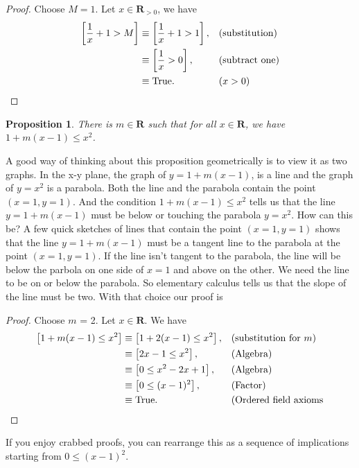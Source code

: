 \documentclass[12pt,fleqn,answers]{article}
\newcommand{\reals}{\mathbf{R}}
\newcommand{\true}{\mathrm{True}}
\newenvironment{myproof}
  {\begin{shaded}\begin{proof}}
  {\end{proof}\end{shaded}}
\newtheorem{prop}{Proposition}
\begin{document}
    \begin{myproof} Choose $M=1$. Let $x  \in \reals_{>0}$, we have
    \begin{align*}
      \left [ \frac{1}{x} + 1 > M \right] &\equiv    \left [ \frac{1}{x} + 1 > 1 \right], &&(\text{substitution}) \\
                                                               &\equiv    \left [ \frac{1}{x}  > 0 \right], &&(\text{subtract one}) \\
                                                               &\equiv \true.    &&  (x > 0) \qedhere
  \end{align*} 
    
    
    \end{myproof}



        \begin{prop}
      There is $m \in \reals$ such that for all $x \in \reals$, we 
     have $1 + m(x-1) \leq x^2$. 
     \end{prop}
     
      A good way of thinking about this proposition geometrically is to view it as two graphs. In the x-y plane, the graph of  $y = 1 + m(x-1)$, is a line  and the
      graph of $y = x^2$  is a parabola.   Both the line  and the parabola contain the point $(x=1,y=1)$. And the 
      condition $1 + m(x-1) \leq x^2$ tells
      us that the line $y = 1 + m(x-1)$ must be below or touching the parabola $y=x^2$.  How can this be? A few quick sketches of lines that
      contain the point $(x=1,y=1)$  shows that the line $y = 1 + m(x-1)$ must be a tangent line to the parabola at the point $(x=1,y=1)$.  If 
      the line isn't tangent to the parabola, the line will be below the parbola on one side of $x=1$ and above on the other.   We need the
      line to be on or below the parabola.  So   elementary calculus tells us that the slope of the line must be two. With that choice
      our proof is      
       \begin{myproof} Choose $m$ = 2. Let $x\in \reals$. We have
       \begin{align*}
         \left[1 + m(x-1) \leq x^2  \right] &\equiv \left[1+2(x-1) \leq  x^2 \right], && \text{(substitution for $m$)} \\
                                      &\equiv \left[2x-1 \leq x^2 \right], 
                                       &&\text{(Algebra)} \\
                                    &\equiv \left[0 \leq x^2 -2x+1 \right], 
                                       &&\text{(Algebra)} \\
                                    &\equiv \left[0 \leq (x-1)^2 \right], 
                                       &&\text{(Factor)} \\
                                      &\equiv \true. &&\text{(Ordered field axioms} \qedhere
       \end{align*}
       \end{myproof}
       \noindent If you enjoy crabbed proofs, you can rearrange this as a sequence of implications starting from $0 \leq (x-1)^2$. 
   
\end{document}
